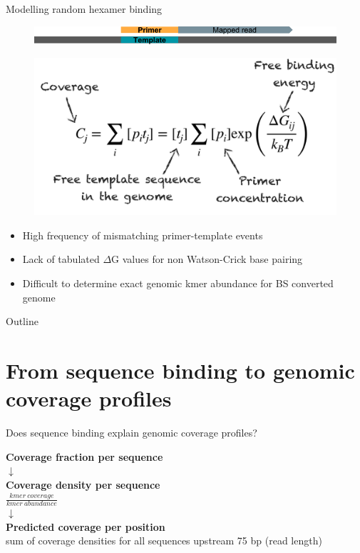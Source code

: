 \documentclass[10pt]{beamer}
\begin{document}
\begin{frame}{Modelling random hexamer binding}
  \vspace{-2cm}
  \begin{figure}
      \centering
      \includegraphics[scale=0.25, trim={0 3cm 0 8cm}, clip]{template_primer.png}
  \end{figure}
\begin{figure}
  \includegraphics[scale=0.3]{model_w_labels.png}
\end{figure}
\begin{itemize}
  \item High frequency of mismatching primer-template events
  \item Lack of tabulated $\Delta$G values for non Watson-Crick base pairing
  \item Difficult to determine exact genomic kmer abundance for BS converted genome
\end{itemize}
\end{frame}

\begin{frame}{Outline}
    \tableofcontents
\end{frame}


\section{From sequence binding to genomic coverage profiles}

\begin{frame}{Does sequence binding explain genomic coverage profiles?}
  \begin{center}
    \textbf{Coverage fraction per sequence} \\
    $\downarrow$ \\
    \textbf{Coverage density per sequence} \\
    $\frac{kmer\ coverage}{kmer\ abundance}$ \\
    $\downarrow$ \\
    \textbf{Predicted coverage per position} \\
    sum of coverage densities for all sequences upstream 75 bp (read length)
  \end{center}
\end{frame}
\end{document}
